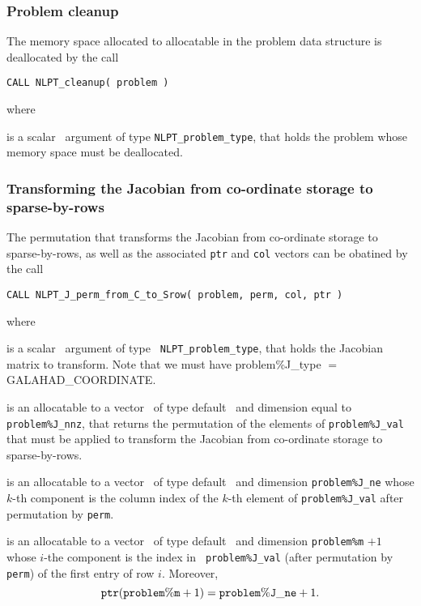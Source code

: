\documentclass{galahad}
\newcommand{\packagename}{NLPT}
\newcommand{\sym}{\sf\small}
\begin{document}
\subsubsection{Problem cleanup}
\label{cleanup}

The memory space allocated to allocatable in the problem data structure is
deallocated by the call
\vspace*{1mm}

\hspace{8mm}
{\tt CALL \packagename\_cleanup( problem )}

\noindent where
\begin{description}
 is a scalar \intentin\ argument of type {\tt NLPT\_problem\_type},
that holds the problem whose memory space must be deallocated.
\end{description}

\subsubsection{Transforming the Jacobian from co-ordinate storage to
sparse-by-rows}
\label{toSrow}

The permutation that transforms the Jacobian from co-ordinate 
storage to sparse-by-rows, as well as the associated {\tt ptr} and {\tt col}
vectors can be obatined by the call
\vspace*{1mm}

\hspace{8mm}
{\tt CALL \packagename\_J\_perm\_from\_C\_to\_Srow( problem, perm, col, ptr )}

\noindent where
\begin{description}
 is a scalar \intentin\ argument of type {\tt
NLPT\_problem\_type}, that holds the Jacobian matrix to transform. Note that
we must have {problem\%J\_type} $=$ {\sym GALAHAD\_COORDINATE}.

 is an allocatable to a vector \intentout\ of type default \integer\ and
dimension equal to {\tt problem\%J\_nnz}, that returns the permutation of the
elements of {\tt problem\%J\_val} that must be applied to transform the
Jacobian from co-ordinate storage to sparse-by-rows.

 is an allocatable to a vector \intentout\ of type default \integer\ and
dimension {\tt problem\%J\_ne} whose $k$-th component is the column index of 
the $k$-th element of {\tt problem\%J\_val} after permutation by {\tt perm}.

 is an allocatable to a vector \intentout\ of type default \integer\ and
dimension {\tt problem\%m} $+1$ whose $i$-the component is the index in {\tt
problem\%J\_val} (after permutation by {\tt perm}) of the first entry of row
$i$. Moreover,
\[
{\tt ptr}({\tt problem\%m}+1 ) = {\tt problem\%J\_ne} + 1.
\]
\end{description}
\end{document}
